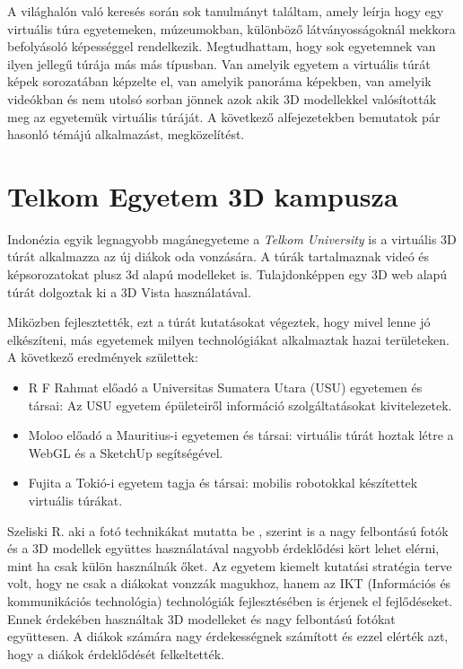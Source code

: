 A világhalón való keresés során sok tanulmányt találtam, amely leírja hogy egy virtuális túra egyetemeken, múzeumokban, különböző látványosságoknál mekkora befolyásoló képességgel rendelkezik. Megtudhattam, hogy sok egyetemnek van ilyen jellegű túrája más más típusban. Van amelyik egyetem a virtuális túrát képek sorozatában képzelte el, van amelyik panoráma képekben, van amelyik videókban és nem utolsó sorban jönnek azok akik 3D modellekkel valósították meg az egyetemük virtuális túráját. A következő alfejezetekben bemutatok pár hasonló témájú alkalmazást, megközelítést.

\section{Telkom Egyetem 3D kampusza}

Indonézia egyik legnagyobb magánegyeteme a {\textit{Telkom University}\footnotemark} \cite{perdana2019implementation} is a virtuális 3D túrát alkalmazza az új diákok oda vonzására. A túrák tartalmaznak videó és képsorozatokat plusz 3d alapú modelleket is. Tulajdonképpen egy 3D web alapú túrát dolgoztak ki a 3D Vista használatával.


Miközben fejlesztették, ezt a túrát kutatásokat végeztek, hogy mivel lenne jó elkészíteni, más egyetemek milyen technológiákat alkalmaztak hazai területeken. A következő eredmények születtek: 
\begin{itemize}
	\item R F Rahmat előadó a Universitas Sumatera Utara (USU) egyetemen és társai: Az USU egyetem épületeiről információ szolgáltatásokat kivitelezetek.
	\item Moloo előadó a Mauritius-i egyetemen és társai: virtuális túrát hoztak létre a WebGL és a SketchUp segítségével.
	\item Fujita a Tokió-i egyetem tagja és társai: mobilis robotokkal készítettek virtuális túrákat.
\end{itemize}

Szeliski R. aki a fotó technikákat mutatta be \cite{perdana2019implementation}, szerint is a nagy felbontású fotók és a 3D modellek együttes használatával nagyobb érdeklődési kört lehet elérni, mint ha csak külön használnák őket. 
Az egyetem kiemelt kutatási stratégia terve volt, hogy ne csak a diákokat vonzzák magukhoz, hanem az IKT (Információs és kommunikációs technológia) technológiák fejlesztésében is érjenek el fejlődéseket. Ennek érdekében használtak 3D modelleket és nagy felbontású fotókat együttesen. A diákok számára nagy érdekességnek számított és ezzel elérték azt, hogy a diákok érdeklődését felkeltették.

